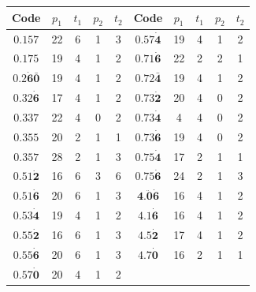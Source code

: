 \documentclass[11pt]{article}
\theoremstyle{definition}
\theoremstyle{plain}
\begin{document}
\begin{center}
    \begin{tabular}{|c|cccc||c|cccc|}
        \hline
        Code & $p_1$ & $t_1$ & $p_2$ & $t_2$ & Code & $p_1$ & $t_1$ & $p_2$ & $t_2$ \\
        \hline
        $\mathbf{0.157}$ & 22 & 6 & 1 & 3       & $\mathbf{0.57\dot{4}}$ & 19 & 4 & 1 & 2 \\
        $\mathbf{0.175}$ & 19 & 4 & 1 & 2       & $\mathbf{0.71\dot{6}}$ & 22 & 2 & 2 & 1 \\
        $\mathbf{0.2\dot{6}\bar{0}}$ & 19 & 4 & 1 & 2 & $\mathbf{0.72\bar{4}}$ & 19 & 4 & 1 & 2 \\
        $\mathbf{0.32\dot{6}}$ & 17 & 4 & 1 & 2 & $\mathbf{0.73\dot{2}}$ & 20 & 4 & 0 & 2 \\
        $\mathbf{0.337}$ & 22 & 4 & 0 & 2       & $\mathbf{0.73\dot{4}}$ & 4 & 4 & 0 & 2  \\
        $\mathbf{0.355}$ & 20 & 2 & 1 & 1       & $\mathbf{0.73\dot{6}}$ & 19 & 4 & 0 & 2 \\
        $\mathbf{0.357}$ & 28 & 2 & 1 & 3       & $\mathbf{0.75\dot{4}}$ & 17 & 2 & 1 & 1 \\
        $\mathbf{0.51\dot{2}}$ & 16 & 6 & 3 & 6 & $\mathbf{0.75\dot{6}}$ & 24 & 2 & 1 & 3 \\
        $\mathbf{0.51\dot{6}}$ & 20 & 6 & 1 & 3 & $\mathbf{4.\ddot{0}\dot{6}}$ & 16 & 4 & 1 & 2 \\
        $\mathbf{0.53\dot{4}}$ & 19 & 4 & 1 & 2 & $\mathbf{4.1\dot{6}}$ & 16 & 4 & 1 & 2 \\
        $\mathbf{0.55\dot{2}}$ & 16 & 6 & 1 & 3 & $\mathbf{4.5\dot{2}}$ & 17 & 4 & 1 & 2 \\
        $\mathbf{0.55\dot{6}}$ & 20 & 6 & 1 & 3 & $\mathbf{4.7\dot{0}}$ & 16 & 2 & 1 & 1 \\
        $\mathbf{0.57\dot{0}}$ & 20 & 4 & 1 & 2 & &&&& \\
        \hline
    \end{tabular}
\end{center}
\end{document}
